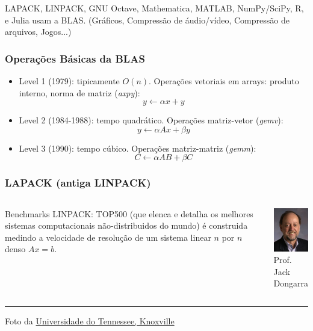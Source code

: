 \documentclass{beamer}
\begin{document}
\begin{darkframes}
\begin{frame}
    LAPACK, LINPACK, GNU Octave, Mathematica, MATLAB, NumPy/SciPy, R, e Julia usam a BLAS. (Gráficos, Compressão de áudio/vídeo, Compressão de arquivos, Jogos...)
  \end{frame}
  
  \begin{frame}
    \frametitle{Operações Básicas da BLAS}
    \begin{itemize}
    \item Level 1 (1979): tipicamente $O(n)$. Operações vetoriais em arrays: produto interno, norma de matriz (\emph{axpy}):
      \begin{equation*}
        y \leftarrow \alpha x + y
      \end{equation*}
    \item Level 2 (1984-1988): tempo quadrático. Operações matriz-vetor (\emph{gemv}):
      \begin{equation*}
        y \leftarrow \alpha A x + \beta y
      \end{equation*}
    \item Level 3 (1990): tempo cúbico. Operações matriz-matriz (\emph{gemm}):
      \begin{equation*}
        C \leftarrow \alpha A B + \beta C
      \end{equation*}
    \end{itemize}
  \end{frame}
  
  \begin{frame}
    \frametitle{LAPACK (antiga LINPACK)}
    \begin{columns}
      \column{5cm}
      Benchmarks LINPACK: TOP500 (que elenca e detalha os melhores sistemas computacionais não-distribuidos do mundo) é construida medindo a velocidade de resolução de um sistema linear $n$ por $n$ denso $Ax = b$.
      \column{4cm}
      \begin{center}
        \includegraphics[width=3.8cm]{figures/JackDongarra.jpg}\\
        Prof. Jack Dongarra
      \end{center}
    \end{columns}
    \vfill
    \hrule
    \vskip0.2cm
    \footnotesize{Foto da \hyperlink{https://commons.wikimedia.org/w/index.php?curid=5234147}{Universidade do Tennessee, Knoxville}}
  \end{frame}
  

\end{darkframes}
\end{document}
